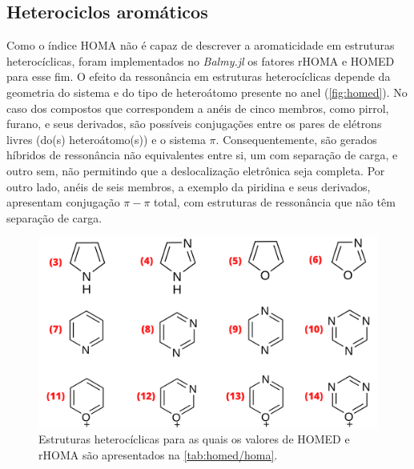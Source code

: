 \newpage

\subsection{Heterociclos aromáticos}

Como o índice \gls{HOMA} não é capaz de descrever a aromaticidade em estruturas heterocíclicas, foram implementados no \textit{Balmy.jl} os fatores \gls{rHOMA} e \gls{HOMED} para esse fim. O efeito da ressonância em estruturas heterocíclicas depende da geometria do sistema e do tipo de heteroátomo presente no anel (\autoref{fig:homed}). No caso dos compostos que correspondem a anéis de cinco membros, como pirrol, furano, e seus derivados, são possíveis conjugações entre os pares de elétrons livres (do(s) heteroátomo(s)) e o sistema $\pi$. Consequentemente, são gerados híbridos de ressonância não equivalentes entre si, um com separação de carga, e outro sem, não permitindo que a deslocalização eletrônica seja completa. Por outro lado, anéis de seis membros, a exemplo da piridina e seus derivados, apresentam conjugação $\pi-\pi$ total, com estruturas de ressonância que não têm separação de carga.

\begin{figure}[htb]
\caption{\label{fig:homed} Estruturas heterocíclicas para as quais os valores de \gls{HOMED} e \gls{rHOMA} são apresentados na \autoref{tab:homed/homa}.}
	\begin{center}
		\includegraphics[width=1.0\textwidth]{images/17.png}
	\end{center}
\end{figure}

